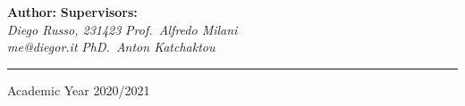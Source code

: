 \begin{titlepage}
\begin{center}
        \textbf{Author:} \hfill \textbf{Supervisors:}\\
        \textit{Diego Russo, 231423} \hfill \textit{Prof.\ Alfredo Milani}\\
        \textit{me@diegor.it} \hfill \textit{PhD.\ Anton Katchaktou}

        \rule[1mm]{\textwidth}{0.2mm}
        \small{Academic Year 2020/2021}
    \end{center}
\end{titlepage}